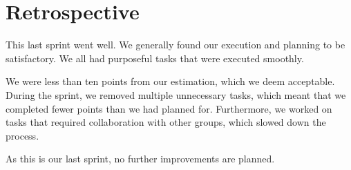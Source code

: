 \section{Retrospective}\label{sec:sprint6retrospective}
This last sprint went well. We generally found our execution and planning to be satisfactory. We all had purposeful tasks that were executed smoothly.

We were less than ten points from our estimation, which we deem acceptable. During the sprint, we removed multiple unnecessary tasks, which meant that we completed fewer points than we had planned for. Furthermore, we worked on tasks that required collaboration with other groups, which slowed down the process.

As this is our last sprint, no further improvements are planned.